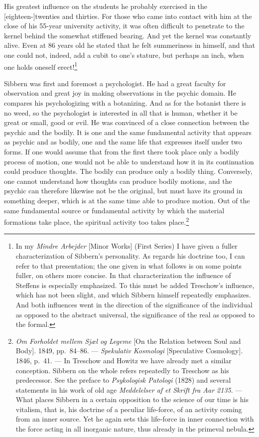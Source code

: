 \documentclass[12pt,a4paper]{book}
\newcommand{\opage}[1]{\marginnote{\footnotesize\textit{[#1]}}}
\begin{document}
His greatest influence on the students he probably exercised in the [eighteen-]twenties
and thirties. For those who came into contact with him at the close of his 55-year
university activity, it was often difficult to penetrate to the kernel behind the
somewhat stiffened bearing. And yet the kernel was constantly alive. Even at 86 years old
he stated that he felt summeriness in himself, and that one could not, indeed, add a
cubit to one's stature, but perhaps an inch, when one holds oneself erect!\footnote{In my
\emph{Mindre Arbejder} [Minor Works] (First Series) I have given a fuller characterization
of Sibbern's personality. As regards his doctrine too, I can refer to that presentation;
the one given in what follows is on some points fuller, on others more concise. In that
characterization the influence of Steffens is especially emphasized. To this must be added
Treschow's influence, which has not been slight, and which Sibbern himself repeatedly
emphasizes. And both influences went in the direction of the significance of the individual
as opposed to the abstract universal, the significance of the real as opposed to the
formal.}

\opage{99}Sibbern was first and foremost a psychologist. He had a great faculty for observation and
great joy in making observations in the psychic domain. He compares his psychologizing
with a botanizing. And as for the botanist there is no weed, so the psychologist is
interested in all that is human, whether it be great or small, good or evil. He was
convinced of a close connection between the psychic and the bodily. It is one and the same
fundamental activity that appears as psychic and as bodily, one and the same life that
expresses itself under two forms. If one would assume that from the first there took place
only a bodily process of motion, one would not be able to understand how it in its
continuation could produce thoughts. The bodily can produce only a bodily thing.
Conversely, one cannot understand how thoughts can produce bodily motions, and the psychic
can therefore likewise not be the original, but must have its ground in something deeper,
which is at the same time able to produce motion. Out of the same fundamental source or
fundamental activity by which the material formations take place, the spiritual activity
too takes place.\footnote{\emph{Om Forholdet mellem Sjæl og Legeme} [On the Relation between
Soul and Body]. 1849, pp.~84--86. --- \emph{Spekulativ Kosmologi} [Speculative Cosmology].
1846, p.~41. --- In Treschow and Howitz we have already met a similar conception. Sibbern on
the whole refers repeatedly to Treschow as his predecessor. See the preface to
\emph{Psykologisk Patologi} (1828) and several statements in his work of old age
\emph{Meddelelser af et Skrift fra Aar 2135}. --- What places Sibbern in a certain
opposition to the science of our time is his vitalism, that is, his doctrine of a peculiar
life-force, of an activity coming from an inner source. Yet he again sets this life-force
in inner connection with the force acting in all inorganic nature, thus already in the
primeval nebula.}
\end{document}
